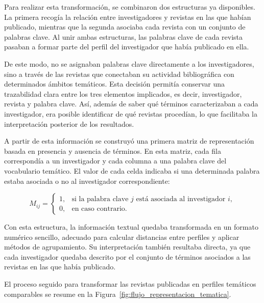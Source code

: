 \documentclass[11pt,spanish,listoffigures,listoftables]{tfgetsinf}
\begin{document}
Para realizar esta transformación, se combinaron dos estructuras ya disponibles. La primera recogía la relación entre investigadores y revistas en las que habían publicado, mientras que la segunda asociaba cada revista con un conjunto de palabras clave. Al unir ambas estructuras, las palabras clave de cada revista pasaban a formar parte del perfil del investigador que había publicado en ella.

De este modo, no se asignaban palabras clave directamente a los investigadores, sino a través de las revistas que conectaban su actividad bibliográfica con determinados ámbitos temáticos. Esta decisión permitía conservar una trazabilidad clara entre los tres elementos implicados, es decir, investigador, revista y palabra clave. Así, además de saber qué términos caracterizaban a cada investigador, era posible identificar de qué revistas procedían, lo que facilitaba la interpretación posterior de los resultados.

A partir de esta información se construyó una primera matriz de representación basada en presencia y ausencia de términos. En esta matriz, cada fila correspondía a un investigador y cada columna a una palabra clave del vocabulario temático. El valor de cada celda indicaba si una determinada palabra estaba asociada o no al investigador correspondiente:

\[
M_{ij} =
\begin{cases}
1, & \text{si la palabra clave } j \text{ está asociada al investigador } i,\\
0, & \text{en caso contrario.}
\end{cases}
\]

Con esta estructura, la información textual quedaba transformada en un formato numérico sencillo, adecuado para calcular distancias entre perfiles y aplicar métodos de agrupamiento. Su interpretación también resultaba directa, ya que cada investigador quedaba descrito por el conjunto de términos asociados a las revistas en las que había publicado.

El proceso seguido para transformar las revistas publicadas en perfiles temáticos comparables se resume en la Figura~\ref{fig:flujo_representacion_tematica}.
\end{document}
